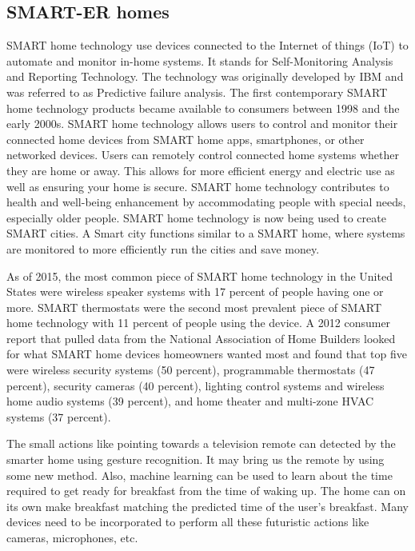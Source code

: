 \documentclass[12pt,a4paper]{article}
\begin{document}
\begin{center}
\section{SMART-ER homes}
\end{center}
\par SMART home technology use devices connected to the Internet of things (IoT) to automate and monitor in-home systems. It stands for Self-Monitoring Analysis and Reporting Technology. The technology was originally developed by IBM and was referred to as Predictive failure analysis. The first contemporary SMART home technology products became available to consumers between 1998 and the early 2000s. SMART home technology allows users to control and monitor their connected home devices from SMART home apps, smartphones, or other networked devices. Users can remotely control connected home systems whether they are home or away. This allows for more efficient energy and electric use as well as ensuring your home is secure. SMART home technology contributes to health and well-being enhancement by accommodating people with special needs, especially older people. SMART home technology is now being used to create SMART cities. A Smart city functions similar to a SMART home, where systems are monitored to more efficiently run the cities and save money.
\par As of 2015, the most common piece of SMART home technology in the United States were wireless speaker systems with 17 percent of people having one or more. SMART thermostats were the second most prevalent piece of SMART home technology with 11 percent of people using the device. A 2012 consumer report that pulled data from the National Association of Home Builders looked for what SMART home devices homeowners wanted most and found that top five were wireless security systems (50 percent), programmable thermostats (47 percent), security cameras (40 percent), lighting control systems and wireless home audio systems (39 percent), and home theater and multi-zone HVAC systems (37 percent).
\par The small actions like pointing towards a television remote can detected by the smarter home using gesture recognition. It may bring us the remote by using some new method. Also, machine learning can be used to learn about the time required to get ready for breakfast from the time of waking up. The home can on its own make breakfast matching the predicted time of the user’s breakfast. Many devices need to be incorporated to perform all these futuristic actions like cameras, microphones, etc.
\end{document}
